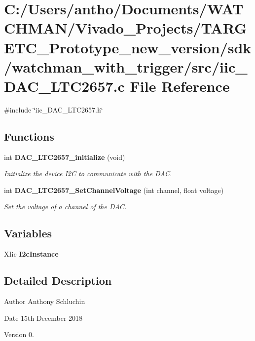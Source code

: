 \section{C\+:/\+Users/antho/\+Documents/\+W\+A\+T\+C\+H\+M\+A\+N/\+Vivado\+\_\+\+Projects/\+T\+A\+R\+G\+E\+T\+C\+\_\+\+Prototype\+\_\+new\+\_\+version/sdk/watchman\+\_\+with\+\_\+trigger/src/iic\+\_\+\+D\+A\+C\+\_\+\+L\+T\+C2657.c File Reference}
\label{iic___d_a_c___l_t_c2657_8c}
{\ttfamily \#include \char`\"{}iic\+\_\+\+D\+A\+C\+\_\+\+L\+T\+C2657.\+h\char`\"{}}\newline
\subsection*{Functions}
\begin{DoxyCompactItemize}
\item 
int \textbf{ D\+A\+C\+\_\+\+L\+T\+C2657\+\_\+initialize} (void)
\begin{DoxyCompactList}\small\item\em Initialize the device I2C to communicate with the D\+AC. \end{DoxyCompactList}\item 
int \textbf{ D\+A\+C\+\_\+\+L\+T\+C2657\+\_\+\+Set\+Channel\+Voltage} (int channel, float voltage)
\begin{DoxyCompactList}\small\item\em Set the voltage of a channel of the D\+AC. \end{DoxyCompactList}\end{DoxyCompactItemize}
\subsection*{Variables}
\begin{DoxyCompactItemize}
\item 
\mbox{\label{iic___d_a_c___l_t_c2657_8c_aad661a691039b6bc19a915c3af0add57}} 
X\+Iic {\bfseries I2c\+Instance}
\end{DoxyCompactItemize}


\subsection{Detailed Description}
\begin{DoxyAuthor}{Author}
Anthony Schluchin 
\end{DoxyAuthor}
\begin{DoxyDate}{Date}
15th December 2018 
\end{DoxyDate}
\begin{DoxyVersion}{Version}
0. 
\end{DoxyVersion}


